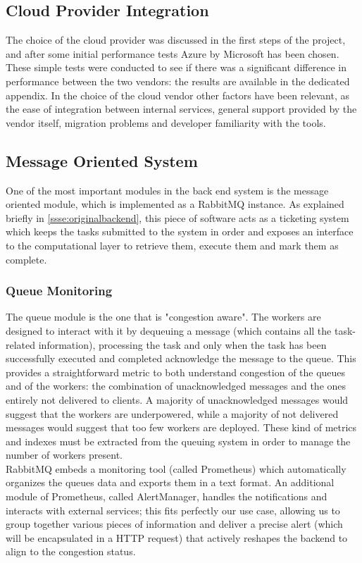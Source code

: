 \subsection{Cloud Provider Integration}
\label{sse:cloudintegration}
  The choice of the cloud provider was discussed in the first steps of the project, and after some initial performance tests Azure by Microsoft has been chosen. These simple tests were conducted to see if there was a significant difference in performance between the two vendors: the results are available in the dedicated appendix. In the choice of the cloud vendor other factors have been relevant, as the ease of integration between internal services, general support provided by the vendor itself, migration problems and developer familiarity with the tools.

\subsection{Message Oriented System}
\label{sse:rabbitmq}
  One of the most important modules in the back end system is the message oriented module, which is implemented as a RabbitMQ instance. As explained briefly in \ref{ssse:originalbackend}, this piece of software acts as a ticketing system which keeps the tasks submitted to the system in order and exposes an interface to the computational layer to retrieve them, execute them and mark them as complete.
  \subsubsection{Queue Monitoring}
  \label{ssse:monitoring}
    The queue module is the one that is "congestion aware". The workers are designed to interact with it by dequeuing a message (which contains all the task-related information), processing the task and only when the task has been successfully executed and completed acknowledge the message to the queue. This provides a straightforward metric to both understand congestion of the queues and of the workers: the combination of unacknowledged messages and the ones entirely not delivered to clients. A majority of unacknowledged messages would suggest that the workers are underpowered, while a majority of not delivered messages would suggest that too few workers are deployed. These kind of metrics and indexes must be extracted from the queuing system in order to manage the number of workers present.\\
    RabbitMQ embeds a monitoring tool (called Prometheus) which automatically organizes the queues data and exports them in a text format. An additional module of Prometheus, called AlertManager, handles the notifications and interacts with external services; this fits perfectly our use case, allowing us to group together various pieces of information and deliver a precise alert (which will be encapsulated in a HTTP request) that actively reshapes the backend to align to the congestion status.
  
